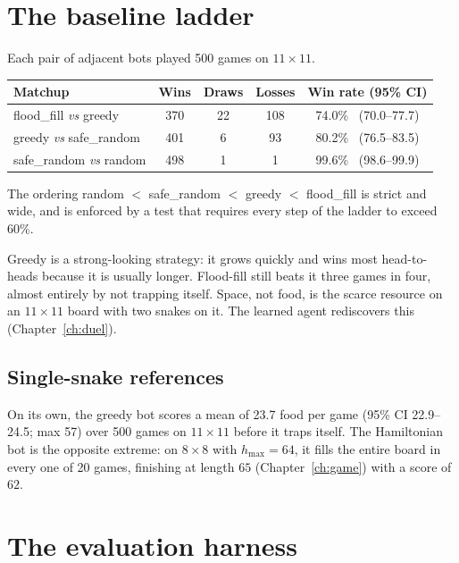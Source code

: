 \section{The baseline ladder}

Each pair of adjacent bots played 500 games on $11\times11$.

\begin{center}
\begin{tabular}{@{}lcccc@{}}
\toprule
\textbf{Matchup} & \textbf{Wins} & \textbf{Draws} & \textbf{Losses} & \textbf{Win rate (95\% CI)}\\
\midrule
flood\_fill \emph{vs} greedy & 370 & 22 & 108 & 74.0\% \ (70.0--77.7)\\
greedy \emph{vs} safe\_random & 401 & 6 & 93 & 80.2\% \ (76.5--83.5)\\
safe\_random \emph{vs} random & 498 & 1 & 1 & 99.6\% \ (98.6--99.9)\\
\bottomrule
\end{tabular}
\end{center}

The ordering random $<$ safe\_random $<$ greedy $<$ flood\_fill is strict and wide, and is
enforced by a test that requires every step of the ladder to exceed 60\%.

\begin{keybox}
Greedy is a strong-looking strategy: it grows quickly and wins most head-to-heads
because it is usually longer. Flood-fill still beats it three games in four, almost
entirely by not trapping itself. Space, not food, is the scarce resource on an
$11\times11$ board with two snakes on it. The learned agent rediscovers this
(Chapter~\ref{ch:duel}).
\end{keybox}

\subsection{Single-snake references}

On its own, the greedy bot scores a mean of 23.7 food per game (95\% CI 22.9--24.5;
max 57) over 500 games on $11\times11$ before it traps itself. The Hamiltonian bot is the
opposite extreme: on $8\times8$ with $h_{\max}=64$, it fills the entire board in every one of
20 games, finishing at length $65$ (Chapter~\ref{ch:game}) with a score of $62$.

\section{The evaluation harness}

